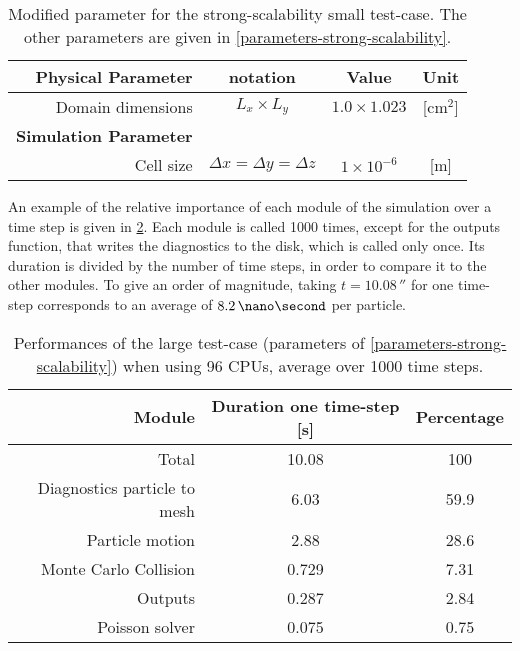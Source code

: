  \begin{table}[hbtp]
    \centering
    \caption{Modified parameter for the strong-scalability small test-case. The other parameters are given in \cref{parameters-strong-scalability}. }
    \label{tab-peremeters-small}
    \begin{tabular}{@{}r c c c@{}} 
      \toprule
      {\bf Physical Parameter} & notation & Value & Unit \\
      \midrule
      Domain dimensions & $L_{x} \times L_{y}$ & $1.0 \times 1.023$ & [cm$^2$] \\
      \midrule
      {\bf Simulation Parameter} &  &   &  \\
      Cell size & $\Delta x = \Delta y = \Delta z $ & $1 \times 10^{-6}$  & [{m}] \\
    \bottomrule
    \end{tabular}
  \end{table}
  
  An example of the relative importance of each module of the simulation over a time step is given in \cref{tab-example_perf}.
  Each module is called 1000 times, except for the outputs function, that writes the diagnostics to the disk, which is called only once.
  Its duration is divided by the number of time steps, in order to compare it to the other modules.
  To give an order of magnitude, taking $t=10.08\,\second$ for one time-step corresponds to an average of $8.2\,\nano\second$ per particle.
  
  \begin{table}[hbtp]
    \centering
    \caption{Performances of the large test-case (parameters of \cref{parameters-strong-scalability}) when using 96 CPUs, average over 1000 time steps. }
    \label{tab-example_perf}
    \begin{tabular}{@{}r c c@{}} 
      \toprule
    Module  & Duration one time-step [s]  & Percentage \\
    \midrule
    Total & 10.08 & 100 \\
    Diagnostics particle to mesh & 6.03 & 59.9 \\
    Particle motion & 2.88 & 28.6 \\
    Monte Carlo Collision & 0.729 & 7.31 \\
    Outputs & 0.287 & 2.84 \\
    Poisson solver & 0.075 & 0.75 \\
    \bottomrule
    \end{tabular}
  \end{table}
  
